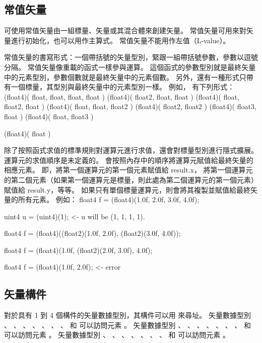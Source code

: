 \subsection{常值矢量}

可使用常值矢量由一組標量、矢量或其混合體來創建矢量。
常值矢量可用來對矢量進行初始化，也可以用作主算式。
常值矢量不能用作左值（L-value）。

常值矢量的書寫形式：一個帶括號的矢量型別，緊跟一組帶括號參數，參數以逗號分隔。
常值矢量像重載的函式一樣參與運算。
這個函式的參數型別就是最終矢量中的元素型別，參數個數就是最終矢量中的元素個數。
另外，還有一種形式只帶有一個標量，其型別與最終矢量中的元素型別一樣。
例如，  有下列形式：
\startclc
(float4)( float, float, float, float )
(float4)( float2, float, float )
(float4)( float, float2, float )
(float4)( float, float, float2 )
(float4)( float2, float2 )
(float4)( float3, float )
(float4)( float, float3 )

(float4)( float )
\stopclc

除了按照函式求值的標準規則對運算元進行求值，還會對標量型別進行隱式擴展。
運算元的求值順序是未定義的。
會按照內存中的順序將運算元賦值給最終矢量的相應元素。
即，將第一個運算元的第一個元素賦值給 result.x，
將第一個運算元的第二個元素（如果第一個運算元是標量，則此處為第二個運算元的第一個元素）
賦值給 result.y，等等。
如果只有單個標量運算元，則會將其複製並賦值給最終矢量的所有元素。
例如：
\startclc
float4	f = (float4)(1.0f, 2.0f, 3.0f, 4.0f);

uint4	u = (uint4)(1);		<- u will be (1, 1, 1, 1).

float4	f = (float4)((float2)(1.0f, 2.0f),
		     (float2)(3.0f, 4.0f));

float4	f = (float4)(1.0f, (float2)(2.0f, 3.0f), 4.0f);

float4	f = (float4)(1.0f, 2.0f);	<- error
\stopclc

\subsection{矢量構件}

對於具有 1 到 4 個構件的矢量數據型別，其構件可以用  來尋址。
矢量數據型別 、 、 、 、
 、 、 、  和 
 可以訪問元素 。
矢量數據型別 、 、 、 、
 、 、 、  和 
 可以訪問元素 。
矢量數據型別 、 、 、 、
 、 、 、  和 
 可以訪問元素 。

